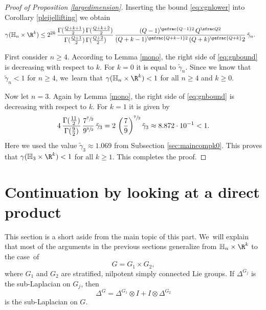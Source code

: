 \begin{proof}[Proof of Proposition \ref{largedimension}]
Inserting the bound \eqref{eq:cgnlower} into Corollary \ref{pleijellifting} we obtain
\begin{align}\label{eq:gnbound}
\gamma(\mathbb H_n\times\R^k) & \leq
2^{2k} \,\frac{\Gamma(\frac{Q+k+1}2)\,\Gamma(\frac{Q+k+2}2)}{\Gamma(\frac{Q+1}2)\,\Gamma(\frac {Q+2}2)} \,\frac{(Q-1)^{\psfrac{Q-1}2} \,Q^{\sfrac Q2}}{(Q+k-1)^{\psfrac{Q+k-1}2} \,(Q+k)^\psfrac{Q+k}2} \,\tilde\gamma_n.
\end{align}

First consider $n\geq 4$. According to Lemma \ref{mono}, the right side of \eqref{eq:gnbound} is decreasing with respect to $k$. For $k=0$ it is equal to $\tilde\gamma_n$. Since we know that $\tilde\gamma_n<1$ for $n\geq 4$, we~learn that $\gamma(\mathbb H_n\times\R^k)<1$ for all $n\geq 4$ and $k\geq 0$.

Now let $n= 3$. Again by Lemma \ref{mono}, the right side of \eqref{eq:gnbound} is decreasing with respect to $k$. For $k=1$ it is given by
\[
4 \,\frac{\Gamma(\frac{11}2)}{\Gamma(\frac{9}2)} \,\frac{7^{\sfrac{7}2}}{9^{\sfrac{9}2}} \,\tilde\gamma_3 = 2 \,\left(\frac 79\right)^{\sfrac{7}2} \tilde\gamma_3
\approx 8.872 \cdot 10^{-1} <1.
\]
Here we used the value $\tilde\gamma_3 \approx 1.069$ from Subsection \ref{sec:maincompk0}. This proves that $\gamma(\mathbb H_3\times\R^k)<1$ for all $k\geq 1$. This completes the proof.
\end{proof}

\section{Continuation by looking at a direct product}\label{s10}
This section is a short aside from the main topic of this part. We~will explain that most of the arguments in the previous sections generalize from $\mathbb H_n\times\R^k$ to the case~of
\[
G = G_1 \times G_2,
\]
where $G_1$ and $G_2$ are stratified, nilpotent simply connected Lie groups. If $\Delta^{G_j}$ is the sub-Laplacian on $G_j$, then
\[
\Delta^G = \Delta^{G_1} \otimes I + I\otimes \Delta^{G_2}
\]
is the sub-Laplacian on $G$.


